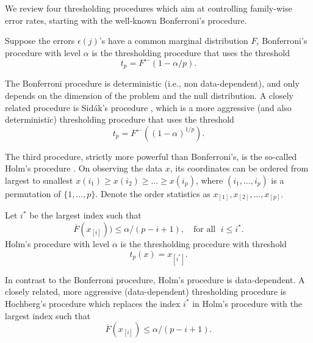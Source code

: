 We review four thresholding procedures which aim at controlling family-wise error rates, starting with the well-known Bonferroni's procedure.
\begin{definition}
Suppose the errors $\epsilon(j)$'s have a common marginal distribution $F$, Bonferroni's procedure with level $\alpha$ is the thresholding procedure that uses the threshold
\begin{equation} \label{eq:Bonferroni-procedure}
    t_p = F^{\leftarrow}(1 - \alpha/p).
\end{equation}
\end{definition}
The Bonferroni procedure is deterministic (i.e., non data-dependent), and only depends on the dimension of the problem and the null distribution.
A closely related procedure is Sid\'ak's procedure \citep{vsidak1967rectangular},
which is a more aggressive (and also deterministic) thresholding procedure that uses the 
threshold
\begin{equation} \label{eq:Sidak-procedure}
    t_p = F^{\leftarrow}((1 - \alpha)^{1/p}).
\end{equation}

The third procedure, strictly more powerful than Bonferroni's, is the so-called Holm's procedure \citep{holm1979simple}.
On observing the data $x$, its coordinates can be ordered from largest to smallest
$x(i_1) \ge x(i_2)  \ge \ldots \ge x(i_p)$,
where $(i_1, \ldots, i_p)$ is a permutation of $\{1, \ldots, p\}$. 
Denote the order statistics as $x_{[1]}, x_{[2]}, \ldots, x_{[p]}$.
\begin{definition}
Let $i^*$ be the largest index such that
$$
\overline{F}(x_{[i]})) \le \alpha / (p-i+1),\quad \text{for all }\;i\le i^*.
$$
Holm's procedure with level $\alpha$ is the thresholding procedure with threshold
\begin{equation} \label{eq:Holm-procedure}
    t_p(x) = x_{[i^*]}.
\end{equation}
\end{definition}
In contrast to the Bonferroni procedure, Holm's procedure is data-dependent.
A closely related, more aggressive (data-dependent) thresholding procedure is Hochberg's procedure \citep{hochberg1988sharper}
which replaces the index $i^*$ in Holm's procedure with the largest index such that
$$
\overline{F}(x_{[i]}) \le \alpha / (p-i+1).
$$

